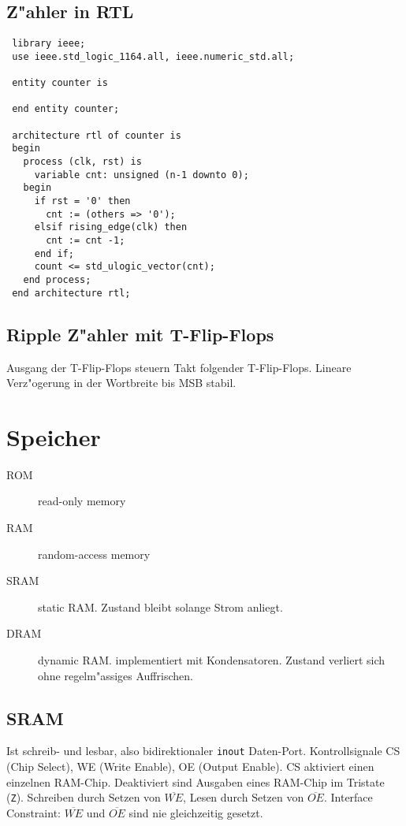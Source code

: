 \documentclass[german, 10pt, a4paper, twocolumn]{scrartcl}
\theoremstyle{definition}
\begin{document}
\subsection{Z"ahler in RTL}

\small
\begin{verbatim}
 library ieee;
 use ieee.std_logic_1164.all, ieee.numeric_std.all;

 entity counter is

 end entity counter;

 architecture rtl of counter is
 begin
   process (clk, rst) is
     variable cnt: unsigned (n-1 downto 0);
   begin
     if rst = '0' then
       cnt := (others => '0');
     elsif rising_edge(clk) then
       cnt := cnt -1;
     end if;
     count <= std_ulogic_vector(cnt);
   end process;
 end architecture rtl;
\end{verbatim}
\normalsize

\subsection{Ripple Z"ahler mit T-Flip-Flops}

Ausgang der T-Flip-Flops steuern Takt folgender T-Flip-Flops. Lineare Verz"ogerung in der Wortbreite bis MSB stabil.

\section{Speicher}

\begin{description}
	\item[ROM] read-only memory
	\item[RAM] random-access memory
	\item[SRAM] static RAM. Zustand bleibt solange Strom anliegt.
	\item[DRAM] dynamic RAM. implementiert mit Kondensatoren. Zustand verliert sich ohne regelm"assiges Auffrischen.
\end{description}

\subsection{SRAM}

Ist schreib- und lesbar, also bidirektionaler \verb#inout# Daten-Port. Kontrollsignale CS (Chip Select), WE (Write Enable), OE (Output Enable). CS aktiviert einen einzelnen RAM-Chip. Deaktiviert sind Ausgaben eines RAM-Chip im Tristate (\verb#Z#). Schreiben durch Setzen von $\overline{WE}$, Lesen durch Setzen von $\overline{OE}$. Interface Constraint: $\overline{WE}$ und $\overline{OE}$ sind nie gleichzeitig gesetzt.
\end{document}
